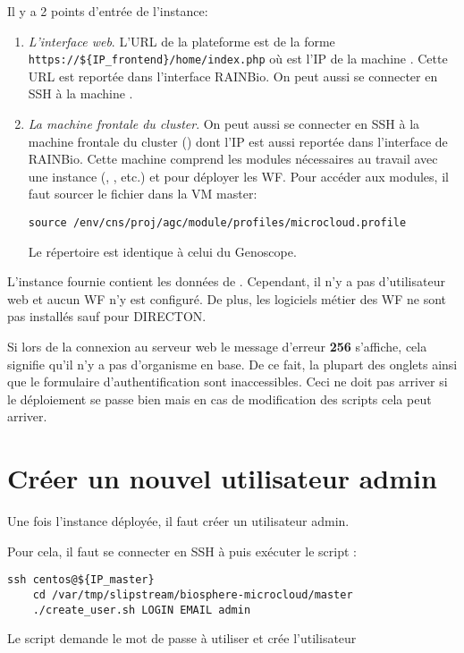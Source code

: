 Il y a 2 points d'entrée de l'instance:
\begin{enumerate}
    \item \emph{L'interface web}. L'URL de la plateforme est de la forme \nolinkurl{https://${IP_frontend}/home/index.php} où 
          est l'IP de la machine .
          Cette URL est reportée dans l'interface RAINBio.
          On peut aussi se connecter en SSH à la machine  .
    \item \emph{La machine frontale du cluster}. On peut aussi se connecter en SSH à la machine frontale du cluster ()
          dont l'IP est aussi reportée dans l'interface de RAINBio.
          Cette machine comprend les modules nécessaires au travail avec une instance (, , etc.)
          et  pour déployer les WF.
          Pour accéder aux modules, il faut sourcer le fichier  dans la VM master:
          \begin{lstlisting}[style=bash,gobble=14]
              source /env/cns/proj/agc/module/profiles/microcloud.profile
          \end{lstlisting}
            Le répertoire  est identique à celui du Genoscope.
\end{enumerate}
L'instance fournie contient les données de \theOrg{}.
Cependant, il n'y a pas d'utilisateur web et aucun WF n'y est configuré.
De plus, les logiciels métier des WF ne sont pas installés sauf pour DIRECTON.

\begin{warningbox}
    Si lors de la connexion au serveur web le message d'erreur \textbf{256} s'affiche, cela signifie qu'il n'y a pas d'organisme en base.
    De ce fait, la plupart des onglets ainsi que le formulaire d'authentification sont inaccessibles.
    Ceci ne doit pas arriver si le déploiement se passe bien mais en cas de modification des scripts cela peut arriver.
\end{warningbox}

\section{Créer un nouvel utilisateur admin}

Une fois l'instance déployée, il faut créer un utilisateur admin.

Pour cela, il faut se connecter en SSH à  puis exécuter le script :
\begin{lstlisting}[style=Bash,gobble=4]
    ssh centos@${IP_master}
    cd /var/tmp/slipstream/biosphere-microcloud/master
    ./create_user.sh LOGIN EMAIL admin
\end{lstlisting}
Le script demande le mot de passe à utiliser et crée l'utilisateur


